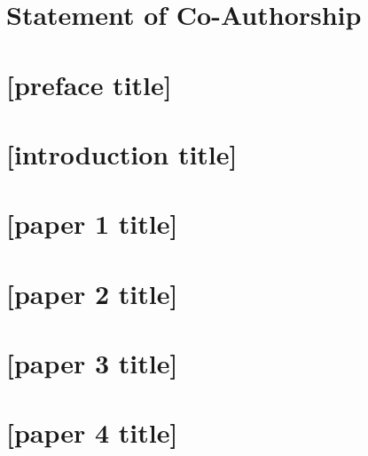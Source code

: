 \documentclass[12pt,openright,twoside]{book}
\makeatletter
\def\cleardoublepage{\clearpage\if@twoside \ifodd\c@page\else
\begingroup
\mbox{}
\thispagestyle{empty}
\newpage
\if@twocolumn\mbox{}\newpage\fi
\endgroup\fi\fi}
\numberwithin{equation}{chapter}
\newcommand{\FirstPaperTitle}{[paper 1 title]}
\newcommand{\SecondPaperTitle}{[paper 2 title]}
\newcommand{\ThirdPaperTitle}{[paper 3 title]}
\newcommand{\FourthPaperTitle}{[paper 4 title]}
\makeatother
\begin{document}
\frontmatter






\chapter*{Statement of Co-Authorship}


{
  \let\oldthepage\thepage   %
  \renewcommand{\thepage}{} %
  \tableofcontents
  \cleardoublepage
  \renewcommand{\thepage}{\oldthepage} %
}



\chapter{[preface title]}


\mainmatter
\chapter{[introduction title]}


\graphicspath{{Paper 1/}} %
\chapter{\FirstPaperTitle} \label{ch:fbnc}


\graphicspath{{Paper 2/}} %
\chapter{\SecondPaperTitle} \label{ch:mcopt}


\graphicspath{{Paper 3/}} %
\chapter{\ThirdPaperTitle} \label{ch:connect}


\graphicspath{{Paper 4/}} %
\chapter{\FourthPaperTitle} \label{ch:role_clust}
 
\end{document}

